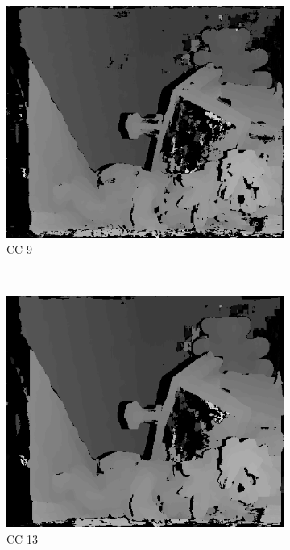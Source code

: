 \begin{figure}
  \begin{subfigure}[b]{0.23\textwidth}
    \centering
    \includegraphics[width=\textwidth]{images/stereo-pairs/teddy_dual_crosschecked_9.png}
    \caption{CC 9}
  \end{subfigure}
  ~
  \begin{subfigure}[b]{0.23\textwidth}
    \centering
    \includegraphics[width=\textwidth]{images/stereo-pairs/teddy_dual_crosschecked_13.png}
    \caption{CC 13}
  \end{subfigure}
  ~
  \begin{subfigure}[b]{0.23\textwidth}

\end{subfigure}
\end{figure}
